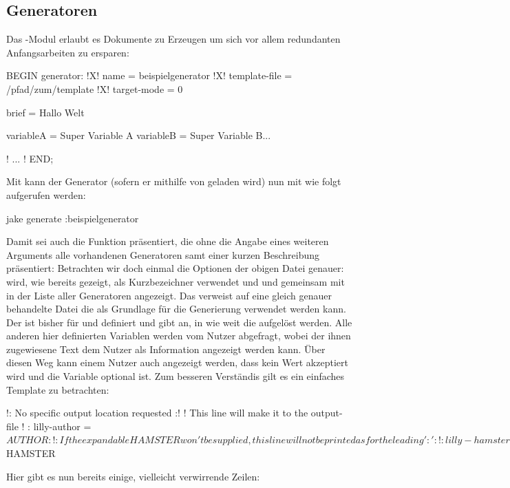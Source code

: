 \subsection{Generatoren}
Das -Modul erlaubt es Dokumente zu Erzeugen um sich vor allem redundanten Anfangsarbeiten zu ersparen:
\begin{gepard}[morekeywords={[3]{variableA,variableB}}]
BEGIN generator:
!X!  name                   = beispielgenerator
!X!  template-file          = /pfad/zum/template
!X!  target-mode            = 0

brief                       = Hallo Welt

variableA = Super Variable A
variableB = Super Variable B...

! ... !
END;
\end{gepard}
Mit \Jake kann der Generator (sofern er mithilfe von  geladen wird) nun mit wie folgt aufgerufen werden:
\begin{bash*}
jake generate :beispielgenerator
\end{bash*}
Damit sei auch die \Jake[-]Funktion  präsentiert, die ohne die Angabe eines weiteren Arguments alle vorhandenen Generatoren samt einer kurzen Beschreibung präsentiert:
Betrachten wir doch einmal die Optionen der obigen Datei genauer:  wird, wie bereits gezeigt, als Kurzbezeichner verwendet und und gemeinsam mit  in der Liste aller Generatoren angezeigt. Das  verweist auf eine gleich genauer behandelte Datei die als Grundlage für die Generierung verwendet werden kann. Der  ist bisher für  und  definiert und gibt an, in wie weit die  aufgelöst werden. \newline
Alle anderen hier definierten Variablen werden vom Nutzer abgefragt, wobei der ihnen zugewiesene Text dem Nutzer als Information angezeigt werden kann. Über diesen Weg kann einem Nutzer auch angezeigt werden, dass kein Wert akzeptiert wird und die Variable optional ist. Zum besseren Verständis gilt es ein einfaches Template zu betrachten:
\begin{gepard}
!: No specific output location requested :!
! This line will make it to the output-file !
:
lilly-author    =     ${AUTHOR}
:
!: If the expandable HAMSTER won't be supplied, this line will not be printed as for the leading ':':!
: lilly-hamster =     ${HAMSTER}
\end{gepard}
Hier gibt es nun bereits einige, vielleicht verwirrende Zeilen:
